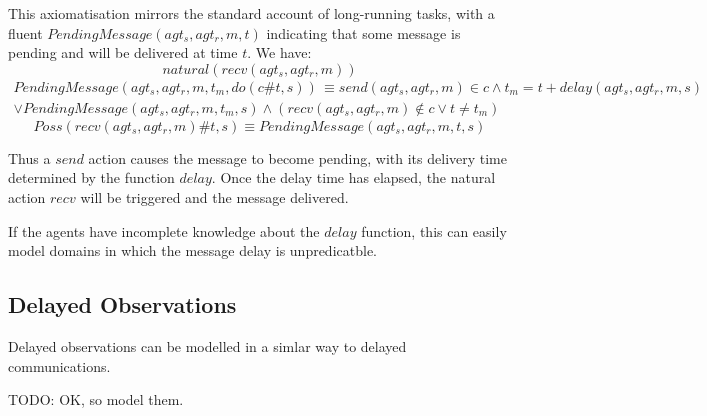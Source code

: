 This axiomatisation mirrors the standard account of long-running tasks,
with a fluent $PendingMessage(agt_{s},agt_{r},m,t)$ indicating that
some message is pending and will be delivered at time $t$. We have:\[
natural(recv(agt_{s},agt_{r},m))\]
 \begin{multline*}
PendingMessage(agt_{s},agt_{r},m,t_{m},do(c\#t,s))\,\equiv send(agt_{s},agt_{r},m)\in c\wedge t_{m}=t+delay(agt_{s},agt_{r},m,s)\\
\vee PendingMessage(agt_{s},agt_{r},m,t_{m},s)\wedge\left(recv(agt_{s},agt_{r},m)\not\in c\vee t\neq t_{m}\right)\end{multline*}
 \[
Poss(recv(agt_{s},agt_{r},m)\#t,s)\equiv PendingMessage(agt_{s},agt_{r},m,t,s)\]


Thus a $send$ action causes the message to become pending, with its
delivery time determined by the function $delay$. Once the delay
time has elapsed, the natural action $recv$ will be triggered and
the message delivered.

If the agents have incomplete knowledge about the $delay$ function,
this can easily model domains in which the message delay is unpredicatble.


\subsection{Delayed Observations}

Delayed observations can be modelled in a simlar way to delayed communications.

TODO: OK, so model them.

